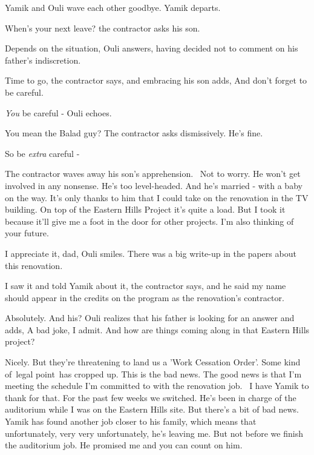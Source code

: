 \documentclass[letterpaper]{article}
\begin{document}
Yamik and Ouli wave each other goodbye. Yamik departs.

{\textquotedbl}When's your next leave?{\textquotedbl} the contractor asks his son. 

{\textquotedbl}Depends on the situation,{\textquotedbl} Ouli answers, having decided not to comment on his father's
indiscretion.

{\textquotedbl}Time to go,{\textquotedbl} the contractor says, and embracing his son adds, {\textquotedbl}And don't
forget to be careful.{\textquotedbl} 

{\textquotedbl}\textit{You} be careful -{\textquotedbl} Ouli echoes. 

{\textquotedbl}You mean the Balad guy?{\textquotedbl} The contractor asks dismissively. {\textquotedbl}He's
fine.{\textquotedbl} 

{\textquotedbl}So be \textit{extra} careful -{\textquotedbl} 

The contractor waves away his son's apprehension.~ {\textquotedbl}Not to worry. He won't get involved in any nonsense.
He's too level-headed. And he's married - with a baby on the way. It's only thanks to him that I could take on the
renovation in the TV building. On top of the Eastern Hills Project it's quite a load. But I took it because it'll give
me a foot in the door for other projects. I'm also thinking of your future.{\textquotedbl} 

{\textquotedbl}I appreciate it, dad,{\textquotedbl} Ouli smiles. {\textquotedbl}There was a big write-up in the papers
about this renovation.{\textquotedbl} 

{\textquotedbl}I saw it and told Yamik about it,{\textquotedbl} the contractor says, {\textquotedbl}and he said my name
should appear in the credits on the program as the renovation's contractor.{\textquotedbl} 

{\textquotedbl}Absolutely. And his?{\textquotedbl} Ouli realizes that his father is looking for an answer and adds,
{\textquotedbl}A bad joke, I admit. And how are things coming along in that Eastern Hills project?{\textquotedbl} 

{\textquotedbl}Nicely. But they're threatening to land us a 'Work Cessation Order'. Some kind of~legal point~has cropped
up. This is the bad news. The good news is that I'm meeting the schedule I'm committed to with the renovation job. \ I
have Yamik to thank for that. For the past few weeks we switched. He's been in charge of the auditorium while I was on
the Eastern Hills site. But there's a bit of bad news. Yamik has found another job closer to his family, which means
that unfortunately, very very unfortunately, he's leaving me. But not before we finish the auditorium job. He promised
me and you can count on him.{\textquotedbl}
\end{document}
